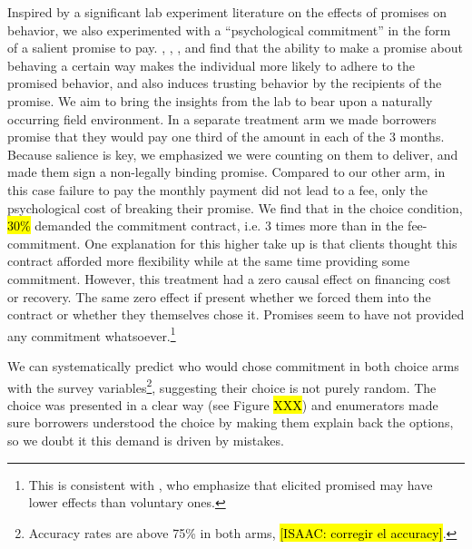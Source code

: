 \documentclass[11pt]{article}
\begin{document}
Inspired by a significant lab experiment literature on the effects of promises on behavior, we also experimented with a ``psychological commitment'' in the form of a salient promise to pay.  \cite{PromisesPartnerships}, \cite{FurtherPromises}, \cite{Vanberg}, and \cite{Ismayilov2017} find that the ability to make a promise about behaving a certain way makes the individual more likely to adhere to the promised behavior, and also induces trusting behavior by the recipients of the promise. We aim to bring the insights from the lab to bear upon a naturally occurring field environment. In a separate treatment arm we made borrowers promise that they would pay one third of the amount in each of the 3 months. Because salience is key, we emphasized we were counting on them to deliver, and made them sign a non-legally binding promise. Compared to our other arm, in this case failure to pay the monthly payment did not lead to a fee, only the psychological cost of breaking their promise. We find that in the choice condition, \hl{30\%} demanded the commitment contract, i.e. 3 times more than in the fee-commitment. One explanation for this higher take up is that clients thought this contract afforded more flexibility while at the same time providing some commitment. However, this treatment had a zero causal effect on financing cost or recovery. The same zero effect if present whether we forced them into the contract or whether they themselves chose it. Promises seem to have not provided any commitment whatsoever.\footnote{This is consistent with \cite{Belot2010}, who emphasize that elicited promised may have lower effects than voluntary ones.}

We can systematically predict who would chose commitment in both choice arms with the survey variables\footnote{Accuracy rates are above 75\% in both arms, \hl{[ISAAC: corregir el accuracy]}.}, suggesting their choice is not purely random. The choice was presented in a clear way (see Figure \hl{XXX}) and enumerators made sure borrowers understood the choice by making them explain back the options, so we doubt it this demand is driven by mistakes. 






\end{document}
